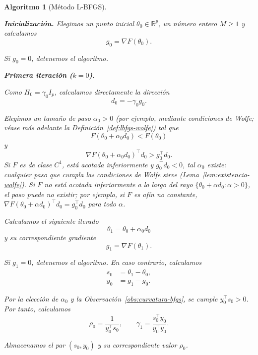 \documentclass[a4paper,openany,oneside,10pt]{report}
\theoremstyle{pnlTeorema}
\theoremstyle{pnlDefinicion}
\newtheorem{algoritmo}{Algoritmo}[section]
\theoremstyle{pnlObservacion}
\begin{document}
\begin{algoritmo}[Método L-BFGS]
\label{alg:lbfgs}

\textbf{Inicialización.}
Elegimos un punto inicial $\theta_0\in\mathbb{R}^p$,
un número entero $M\geq 1$ y calculamos
\[
    g_0=\nabla F(\theta_0).
\]

Si $g_0=0$, detenemos el algoritmo.

\medskip

\noindent\textbf{Primera iteración ($k=0$).}

Como $H_0=\gamma_0I_p$, calculamos directamente la dirección
\[
    d_0=-\gamma_0g_0.
\]

Elegimos un tamaño de paso $\alpha_0>0$ (por ejemplo, mediante condiciones de Wolfe; véase más adelante la Definición~\ref{def:lbfgs-wolfe}) tal que
\[
    F(\theta_0+\alpha_0 d_0)<F(\theta_0)
\]
y
\[
    \nabla F(\theta_0+\alpha_0 d_0)^\top d_0
    >g_0^\top d_0.
\]
Si $F$ es de clase $C^1$, está acotada inferiormente y $g_0^\top d_0<0$, tal $\alpha_0$ existe: cualquier paso que cumpla las condiciones de Wolfe sirve (Lema~\ref{lem:existencia-wolfe}). Si $F$ no está acotada inferiormente a lo largo del rayo $\{\theta_0+\alpha d_0:\alpha>0\}$, el paso puede no existir; por ejemplo, si $F$ es afín no constante, $\nabla F(\theta_0+\alpha d_0)^\top d_0=g_0^\top d_0$ para todo $\alpha$.

Calculamos el siguiente iterado
\[
    \theta_1=\theta_0+\alpha_0 d_0
\]
y su correspondiente gradiente
\[
    g_1=\nabla F(\theta_1).
\]

Si $g_1=0$, detenemos el algoritmo.
En caso contrario, calculamos
\[
    \begin{aligned}
        s_0&=\theta_1-\theta_0,\\
        y_0&=g_1-g_0.
    \end{aligned}
\]

Por la elección de $\alpha_0$ y la Observación~\ref{obs:curvatura-bfgs},
se cumple $y_0^\top s_0>0$. Por tanto, calculamos
\[
    \rho_0=\frac{1}{y_0^\top s_0},
    \qquad
    \gamma_1=\frac{s_0^\top y_0}{y_0^\top y_0}.
\]

Almacenamos el par $(s_0,y_0)$ y su correspondiente
valor $\rho_0$.

\medskip


\end{algoritmo}
\end{document}
